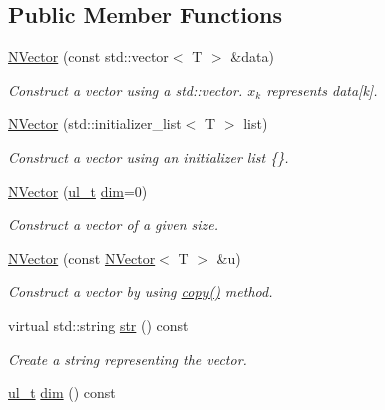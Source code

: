 \subsection*{Public Member Functions}
\begin{DoxyCompactItemize}
\item 
\mbox{\hyperlink{class_n_vector_a786957fb5d1d9bdec7e6ced65bce03c0}{N\+Vector}} (const std\+::vector$<$ T $>$ \&data)
\begin{DoxyCompactList}\small\item\em Construct a vector using a {\ttfamily std\+::vector}. $ x_k $ represents {\ttfamily data\mbox{[}k\mbox{]}}. \end{DoxyCompactList}\item 
\mbox{\hyperlink{class_n_vector_a44c7b132c668c2aac890b66fe7ab0262}{N\+Vector}} (std\+::initializer\+\_\+list$<$ T $>$ list)
\begin{DoxyCompactList}\small\item\em Construct a vector using an initializer list {\ttfamily \{\}}. \end{DoxyCompactList}\item 
\mbox{\hyperlink{class_n_vector_a58eee5f012e4e563d477788051fc7f1d}{N\+Vector}} (\mbox{\hyperlink{typedef_8h_a1b140a2034db3f5dfe18a987745df43a}{ul\+\_\+t}} \mbox{\hyperlink{class_n_vector_a7589027db20509ac4d93490bb9a1979a}{dim}}=0)
\begin{DoxyCompactList}\small\item\em Construct a vector of a given size. \end{DoxyCompactList}\item 
\mbox{\hyperlink{class_n_vector_a7f648402b0fc9006ce9ced7ca647e600}{N\+Vector}} (const \mbox{\hyperlink{class_n_vector}{N\+Vector}}$<$ T $>$ \&u)
\begin{DoxyCompactList}\small\item\em Construct a vector by using {\ttfamily \mbox{\hyperlink{class_n_vector_a67128d2ff536b8ccd7a95cb680bd0431}{copy()}}} method. \end{DoxyCompactList}\item 
virtual std\+::string \mbox{\hyperlink{class_n_vector_a6d66b06b953197c1b3965ed69f9fd17e}{str}} () const
\begin{DoxyCompactList}\small\item\em Create a string representing the vector. \end{DoxyCompactList}\item 
\mbox{\hyperlink{typedef_8h_a1b140a2034db3f5dfe18a987745df43a}{ul\+\_\+t}} \mbox{\hyperlink{class_n_vector_a7589027db20509ac4d93490bb9a1979a}{dim}} () const

\end{DoxyCompactItemize}
